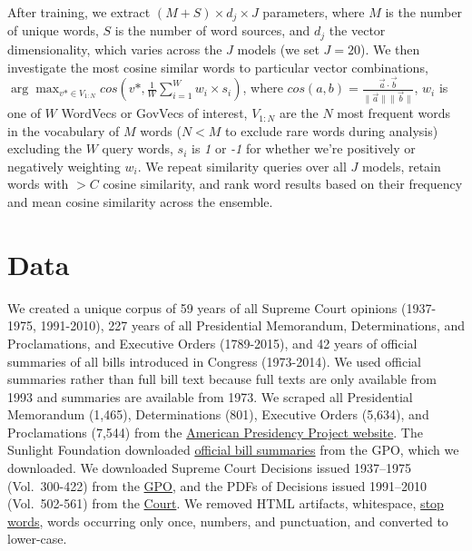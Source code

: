 \documentclass[11pt,letterpaper]{article}
\begin{document}
After training, we extract \((M + S) \times d_j \times J\) parameters,
where \(M\) is the number of unique words, \(S\) is the number of word sources, and \(d_j\) the vector
dimensionality, which varies across the \(J\) models (we set $J=20$). We then
investigate the most cosine similar words to particular vector
combinations, \(\arg\max_{v* \in V_{1:N}}{cos(v*, \frac{1}{W} \sum_{i=1}^{W} w_i \times s_i)}\),
where \(cos(a, b) = \frac{\vec{a} \cdot \vec{b}}{\lVert \vec{a}  \rVert \lVert \vec{b}  \rVert}\), \(w_i\) is one of \(W\) WordVecs or GovVecs of interest,
\(V_{1:N}\) are the \(N\) most frequent words in the vocabulary of \(M\)
words (\(N<M\) to exclude rare words during analysis) excluding the \(W\) query words, \(s_i\) is \emph{1} or
\emph{-1} for whether we're positively or negatively weighting \(w_i\).
We repeat similarity queries over all \(J\) models, retain words with $> C$ cosine similarity, and rank word results
based on their frequency and mean cosine similarity across the ensemble. 

\section{Data}\label{data}

We created a unique corpus of 59 years of all Supreme Court opinions (1937-1975, 1991-2010), 227 years of all Presidential Memorandum, Determinations, and Proclamations, and Executive Orders (1789-2015), and 42 years of official summaries of all bills introduced in Congress (1973-2014). We used official summaries rather than full bill text because full texts are only available from 1993 and summaries are available from 1973. We scraped all Presidential Memorandum (1,465), Determinations (801), Executive Orders (5,634), and Proclamations (7,544) from the \href{http://www.presidency.ucsb.edu/}{American Presidency Project website}. The Sunlight Foundation downloaded \href{https://github.com/unitedstates/congress/wiki}{official bill summaries} from the GPO, which we downloaded. We downloaded Supreme Court Decisions issued 1937--1975 (Vol.~300-422) from the \href{https://www.gpo.gov/fdsys/bulkdata/SCD/1937}{GPO}, and the PDFs of Decisions issued 1991--2010 (Vol.~502-561) from the \href{http://www.supremecourt.gov/opinions/boundvolumes.aspx}{Court}. We removed HTML artifacts, whitespace, \href{http://jmlr.csail.mit.edu/papers/volume5/lewis04a/a11-smart-stop-list/english.stop}{stop words}, words occurring only once, numbers, and punctuation, and converted to lower-case.
\end{document}
